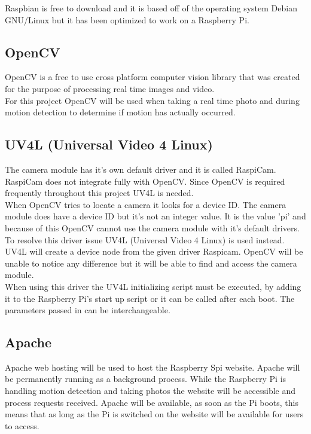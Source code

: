 \documentclass[12pt]{report}
\begin{document}
Raspbian is free to download and it is based off of the operating system Debian GNU/Linux but it has been optimized to work on a Raspberry Pi. \\ 

\newpage
\noindent
\subsection{OpenCV}
\label{subsec:OpenCV}

OpenCV is a free to use cross platform computer vision library that was created for the purpose of processing real time images and video.\\

For this project OpenCV will be used when taking a real time photo and during motion detection to determine if motion has actually occurred.\\

\noindent
\subsection{UV4L (Universal Video 4 Linux)}
\label{subsec:UV4L}
The camera module has it's own default driver and it is called RaspiCam. RaspiCam does not integrate fully with OpenCV. Since OpenCV is required frequently throughout this project UV4L is needed.\\

When OpenCV tries to locate a camera it looks for a device ID. The camera module does have a device ID but it's not an integer value. It is the value 'pi' and because of this OpenCV cannot use the camera module with it's default drivers. To resolve this driver issue UV4L (Universal Video 4 Linux) is used instead. UV4L will create a device node from the given driver Raspicam. OpenCV will be unable to notice any difference but it will be able to find and access the camera module.\\

When using this driver the UV4L initializing script must be executed, by adding it to the Raspberry Pi's start up script or it can be called after each boot. The parameters passed in can be interchangeable. \\


\noindent
\subsection{Apache}
\label{subsec:Apache}
Apache web hosting will be used to host the Raspberry Spi website. Apache will be permanently running as a background process. While the Raspberry Pi is handling motion detection and taking photos the website will be accessible and process requests received. Apache will be available, as soon as the Pi boots, this means that as long as the Pi is switched on the website will be available for users to access.\\ 
\end{document}
